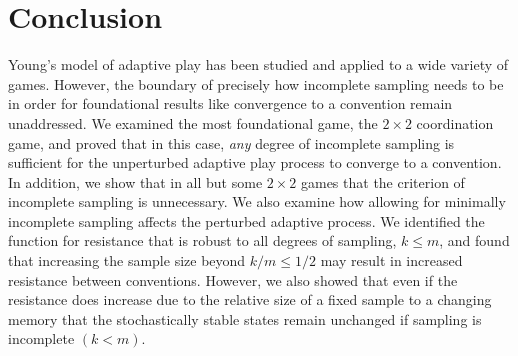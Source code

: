 
\section{Conclusion}

Young's model of adaptive play has been studied and applied to a wide variety of games. However, the boundary of precisely how incomplete sampling needs to be in order for foundational results like convergence to a convention remain unaddressed. We examined the most foundational game, the $2\times 2$ coordination game, and proved that in this case, \textit{any} degree of incomplete sampling is sufficient for the unperturbed adaptive play process to converge to a convention. In addition, we show that in all but some $2 \times 2$ games that the criterion of incomplete sampling is unnecessary. We also examine how allowing for minimally incomplete sampling affects the perturbed adaptive process. We identified the function for resistance that is robust to all degrees of sampling, $k \leq m$, and found that increasing the sample size beyond $k/m \leq 1/2$ may result in increased resistance between conventions. However, we also showed that even if the resistance does increase due to the relative size of a fixed sample to a changing memory that the stochastically stable states remain unchanged if sampling is incomplete $(k<m)$.



